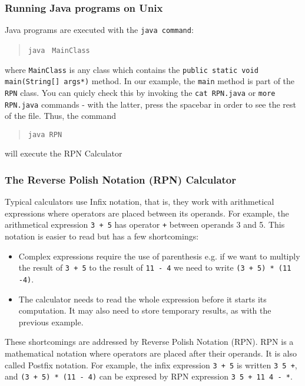 \documentclass{article}
\newcommand{\fname}[1]{\texttt{#1}}
\begin{document}
\subsubsection*{Running Java programs on Unix}

Java programs are executed with the {\tt java command}:

\begin{quote}
{\tt java } \fname{MainClass}
\end{quote}

where \fname{MainClass} is any class which contains the {\tt public static void main(String[] args*)} method. In our example, the {\tt main} method is part of the {\tt RPN} class. You can quicly check this by invoking the {\tt cat RPN.java} or {\tt more RPN.java} commands - with the latter, press the spacebar in order to see the rest of the file. Thus, the command

\begin{quote}
{\tt java RPN}
\end{quote}

will execute the RPN Calculator

\subsubsection*{The Reverse Polish Notation (RPN) Calculator}

Typical calculators use Infix notation, that is, they work with arithmetical expressions where operators are placed between its operands. For example, the arithmetical expression {\tt 3 + 5} has operator {\tt +} between operands 3 and 5. This notation is easier to read but has a few shortcomings:
\begin{itemize}
\item Complex expressions require the use of parenthesis e.g. if we want to multiply the result of {\tt 3 + 5} to the result of {\tt 11 - 4} we need to write {\tt (3 + 5) * (11 -4)}.
\item The calculator needs to read the whole expression before it starts its computation. It may also need to store temporary results, as with the previous example.
\end{itemize}

These shortcomings are addressed by Reverse Polish Notation (RPN). RPN is a mathematical notation where operators are placed after their operands. It is also called Postfix notation. For example, the infix expression {\tt 3 + 5} is written {\tt 3 5 +}, and {\tt (3 + 5) * (11 - 4)} can be expresed by RPN expression {\tt 3 5 + 11 4 - *}.
\end{document}
